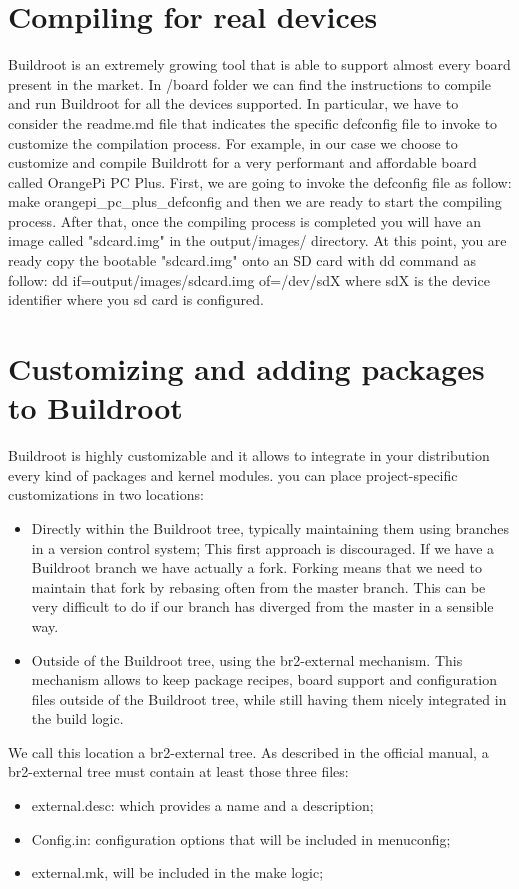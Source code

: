 \documentclass[a4paper,twoside,11pt]{article}
\begin{document}
\section{Compiling for real devices}
Buildroot is an extremely growing tool that is able to support almost every board present in the market.
In /board folder we can find the instructions to compile and run Buildroot for all the devices supported.
In particular, we have to consider the readme.md file that indicates the specific defconfig file to invoke to customize the compilation process.
For example, in our case we choose to customize and compile Buildrott for a very performant and affordable board called OrangePi PC Plus.
First, we are going to invoke the defconfig file as follow:
make orangepi\_pc\_plus\_defconfig and then we are ready to start the compiling process.
After that, once the compiling process is completed you will have an image called "sdcard.img"
in the output/images/ directory.
At this point, you are ready copy the bootable "sdcard.img" onto an SD card with dd command as follow:
dd if=output/images/sdcard.img of=/dev/sdX
where sdX is the device identifier  where you sd card is configured.

\section{Customizing and adding packages to Buildroot}
Buildroot is highly customizable and it allows to integrate in your distribution every kind of packages and kernel modules.
you can place project-specific customizations in two locations:
\begin{itemize}
\item Directly within the Buildroot tree, typically maintaining them using branches in a version control system;
This first approach is discouraged. If we have a Buildroot branch we have actually a fork. Forking means that we need to maintain that fork by rebasing often from the master branch. 
This can be very difficult to do if our branch has diverged from the master in a sensible way.
\item Outside of the Buildroot tree, using the br2-external mechanism. 
This mechanism allows to keep package recipes, board support and configuration files outside of the Buildroot tree, while still having them nicely integrated in the build logic.
\end{itemize} 
We call this location a br2-external tree. 
As described in the official manual, a br2-external tree must contain at least those three files:
\begin{itemize}
\item external.desc: which provides a name and a description;
\item Config.in: configuration options that will be included in menuconfig;
\item external.mk, will be included in the make logic;
\end{itemize}
\end{document}
